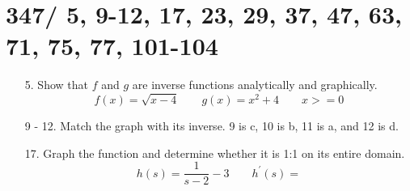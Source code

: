 \documentclass[11pt]{article}
\begin{document}
\section*{\textsf{347/ 5, 9-12, 17, 23, 29, 37, 47, 63, 71, 75, 77, 101-104}}
\begin{itemize}
	\item[5. ] Show that $f$ and $g$ are inverse functions analytically and graphically.
	$$ f(x) = \sqrt{x-4} \qquad g(x) = x^2+4 \qquad x >= 0$$
	\item[9 - 12. ] Match the graph with its inverse. 9 is c, 10 is b, 11 is a, and 12 is d.
	\item[17. ] Graph the function and determine whether it is 1:1 on its entire domain. $$ h(s) = \frac{1}{s-2} -3 \qquad h^\prime (s) = $$
\end{itemize}
\end{document}
